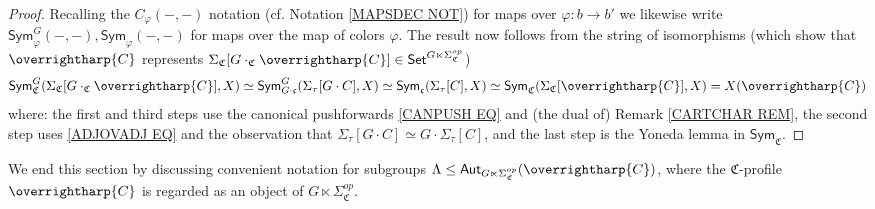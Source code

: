 \documentclass[a4paper,10pt
]{article}%
\numberwithin{equation}{section}
\numberwithin{figure}{section}
\theoremstyle{definition} %
\newcommand{\vect}[1]{\text{\overrightharp{\ensuremath{#1}}}}
\newcommand{\1}{\ensuremath{\mathbbm 1}}%
\begin{document}
\begin{proof}
	Recalling the $C_{\varphi}(-,-)$ notation (cf. Notation \ref{MAPSDEC NOT})
	for maps over $\varphi\colon b \to b'$ we likewise write 
	$\mathsf{Sym}^G_{\varphi}(-,-),\mathsf{Sym}_{\varphi}(-,-)$
	for maps over the map of colors $\varphi$.
	The result now follows from the string of isomorphisms
	(which show that $\vect{C}$ represents
	$\Sigma_{\mathfrak{C}} [G \cdot_{\mathfrak{C}} \vect{C}] \in \mathsf{Set}^{G \ltimes \Sigma^{op}_{\mathfrak{C}}}$)
	\[
	\mathsf{Sym}^G_{\mathfrak{C}}
	(\Sigma_{\mathfrak{C}} [G \cdot_{\mathfrak{C}} \vect{C}],X)
	\simeq
	\mathsf{Sym}^G_{G \cdot \mathfrak{c}}
	(\Sigma_{\tau} [G \cdot C],X)
	\simeq
	\mathsf{Sym}_{\mathfrak{c}}
	(\Sigma_{\tau} [C],X)
	\simeq
	\mathsf{Sym}_{\mathfrak{C}}
	(\Sigma_{\mathfrak{C}}[\vect{C}],X)
	=
	X(\vect{C})
	\]
	where:
        the first and third steps 
        use the canonical pushforwards \eqref{CANPUSH EQ}
        and (the dual of) Remark \ref{CARTCHAR REM},
        the second step uses \eqref{ADJOVADJ EQ}
        and the observation that
        $\Sigma_{\tau}[G \cdot C] \simeq G \cdot \Sigma_{\tau}[C]$, and
        the last step is the Yoneda lemma in $\mathsf{Sym}_{\mathfrak{C}}$.
\end{proof}




We end this section by discussing convenient notation  
for subgroups 
$\Lambda \leq \mathsf{Aut}_{G \ltimes \Sigma_{\mathfrak{C}}^{op}}(\vect{C})$,
where the $\mathfrak{C}$-profile $\vect{C}$
is regarded as an object of 
$G \ltimes \Sigma_{\mathfrak{C}}^{op}$.
\end{document}
